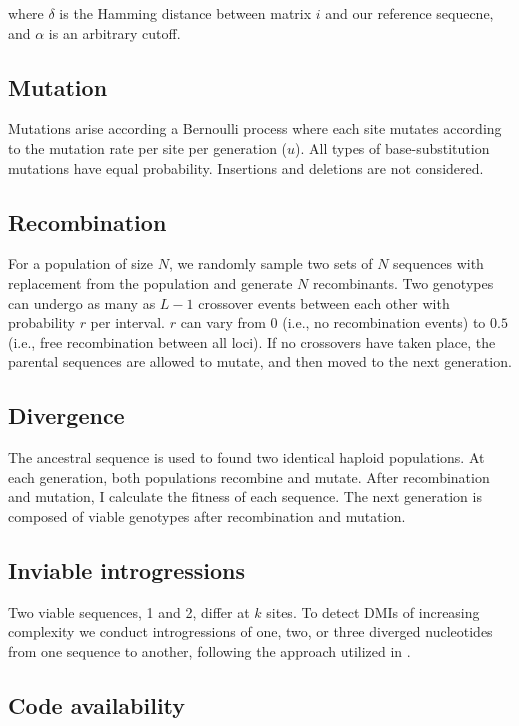 \documentclass[10pt,letterpaper]{article}
\begin{document}
where $\delta$ is the Hamming distance between matrix $i$ and our reference sequecne, and $\alpha$ is an arbitrary cutoff.

\subsection*{Mutation}

Mutations arise according a Bernoulli process where each site mutates according to the mutation rate per site per generation ($u$). All types of base-substitution mutations have equal probability.  Insertions and deletions are not considered.

\subsection*{Recombination}

For a population of size $N$, we randomly sample two sets of $N$ sequences with replacement from the population and generate $N$ recombinants. Two genotypes can undergo as many as $L-1$ crossover events between each other with probability $r$ per interval. $r$ can vary from $0$ (i.e., no recombination events) to $0.5$ (i.e., free recombination between all loci). If no crossovers have taken place, the parental sequences are allowed to mutate, and then moved to the next generation.

\subsection*{Divergence}

The ancestral sequence is used to found two identical haploid populations. At each generation, both populations recombine and mutate. After recombination and mutation, I calculate the fitness of each sequence. The next generation is composed of viable genotypes after recombination and mutation.  

\subsection*{Inviable introgressions}

Two viable sequences, 1 and 2, differ at $k$ sites.  To detect DMIs of increasing complexity we conduct introgressions of one, two, or three diverged nucleotides from one sequence to another, following the approach utilized in \cite{Kalirad2017a}.

\subsection*{Code availability}
\end{document}
